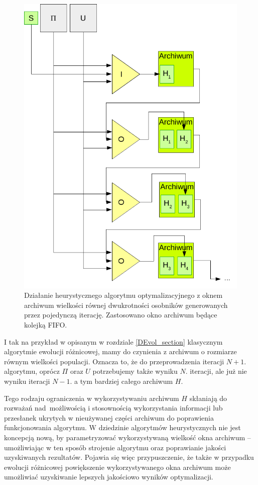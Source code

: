 \documentclass[12pt,a4paper]{report}
\begin{document}
{{%
\begin{figure}[htb]
\begin{center}\includegraphics[scale=0.5]{img/ModelArchiwumFIFO2}\end{center}
\caption{Działanie heurystycznego algorytmu optymalizacyjnego z oknem archiwum wielkości równej dwukrotności osobników generowanych przez pojedynczą iterację. Zastosowano okno archiwum będące kolejką FIFO.}
\label{ModelArchiwumImg}
\end{figure}

\par{
I tak na przykład w opisanym w rozdziale \ref{DEvol_section} klasycznym algorytmie ewolucji różnicowej, mamy do czynienia z archiwum o rozmiarze równym wielkości populacji. Oznacza to, że do przeprowadzenia iteracji $N+1.$ algorytmu, oprócz $\Pi$ oraz $U$ potrzebujemy także wyniku $N.$ iteracji, ale już nie wyniku iteracji $N-1$. a tym bardziej całego archiwum $H$.
}
\par{
Tego rodzaju ograniczenia w wykorzystywaniu archiwum $H$ skłaniają do rozważań nad~możliwością i stosownością wykorzystania informacji lub przesłanek ukrytych w nieużywanej części archiwum do poprawienia funkcjonowania algorytmu. W dziedzinie algorytmów heurystycznych nie jest koncepcją nową, by parametryzować wykorzystywaną wielkość okna archiwum -- umożliwiając w ten sposób strojenie algorytmu oraz poprawianie jakości uzyskiwanych rezultatów. Pojawia się więc przypuszczenie, że także w przypadku ewolucji różnicowej powiększenie wykorzystywanego okna archiwum może umożliwiać uzyskiwanie lepszych jakościowo wyników optymalizacji.
}


}}
\end{document}
